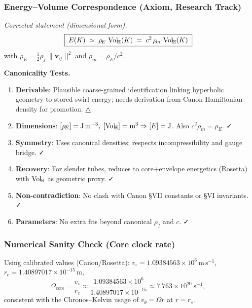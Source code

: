 \subsubsection{Energy–Volume Correspondence (Axiom, Research Track)}
\emph{Corrected statement (dimensional form).}
\[
    \boxed{\;E(K)\;\simeq\;\rho_{\!E}\,\operatorname{Vol}_{\!\mathbb{H}}(K)\;=\;c^{2}\,\rho_{\!m}\,\operatorname{Vol}_{\!\mathbb{H}}(K)\;}
\]
with $\rho_{\!E}=\tfrac12 \rho_{\!f}\,\lVert \mathbf{v}_{\!\boldsymbol{\circlearrowleft}}\rVert^{2}$ and $\rho_{\!m}=\rho_{\!E}/c^{2}$.

\textbf{Canonicality Tests.}
\begin{enumerate}
    \item \textbf{Derivable}: Plausible coarse-grained identification linking hyperbolic geometry to stored swirl energy; needs derivation from Canon Hamiltonian density for promotion. △
    \item \textbf{Dimensions}: $[\rho_{\!E}]=\mathrm{J\,m^{-3}},\; [\operatorname{Vol}_{\!\mathbb{H}}]=\mathrm{m^3}\Rightarrow [E]=\mathrm{J}$. Also $c^{2}\rho_{\!m}=\rho_{\!E}$. ✓
    \item \textbf{Symmetry}: Uses canonical densities; respects incompressibility and gauge bridge. ✓
    \item \textbf{Recovery}: For slender tubes, reduces to core+envelope energetics (Rosetta) with $\operatorname{Vol}_{\!\mathbb{H}}$ as geometric proxy. ✓
    \item \textbf{Non-contradiction}: No clash with Canon §VII constants or §VI invariants. ✓
    \item \textbf{Parameters}: No extra fits beyond canonical $\rho_{\!f}$ and $c$. ✓
\end{enumerate}

\subsubsection{Numerical Sanity Check (Core clock rate)}
Using calibrated values (Canon/Rosetta): $v_\circ=1.09384563\times 10^{6}\,\mathrm{m\,s^{-1}}$,
$r_c=1.40897017\times 10^{-15}\,\mathrm{m}$,
\[
    \Omega_{\text{core}}=\frac{v_\circ}{r_c}\approx
    \frac{1.09384563\times 10^{6}}{1.40897017\times 10^{-15}}
    \approx 7.763\times 10^{20}\ \mathrm{s^{-1}},
\]
consistent with the Chronos–Kelvin usage of $v_\theta=\Omega r$ at $r=r_c$.


